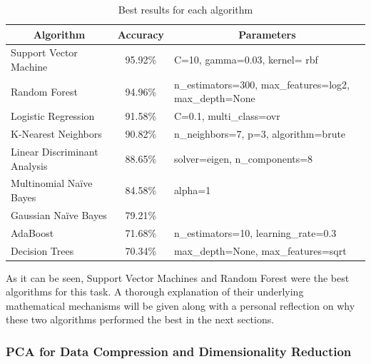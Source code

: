 \documentclass[letterpaper,10pt]{article}
\theoremstyle{mytheor}
\begin{document}
\begin{table}[H]
\centering
\begin{tabular}{|l|c|l|}
\hline
\multicolumn{1}{|c|}{\textbf{Algorithm}} & \textbf{Accuracy} & \multicolumn{1}{c|}{\textbf{Parameters}}          \\ \hline
Support Vector Machine                                      & 95.92\%           & C=10, gamma=0.03, kernel= rbf                     \\ \hline
Random Forest                             & 94.96\%           & n\_estimators=300, max\_features=log2, max\_depth=None \\ \hline
Logistic Regression                      & 91.58\%           & C=0.1, multi\_class=ovr                           \\ \hline
K-Nearest Neighbors                               & 90.82\%           & n\_neighbors=7, p=3, algorithm=brute                    \\ \hline
Linear Discriminant Analysis             & 88.65\%           & solver=eigen, n\_components=8                      \\ \hline
Multinomial Naïve Bayes                  & 84.58\%           & alpha=1                                           \\ \hline
Gaussian Naïve Bayes                     & 79.21\%           &                                                   \\ \hline
AdaBoost                                 & 71.68\%           & n\_estimators=10, learning\_rate=0.3                  \\ \hline
Decision Trees                           & 70.34\%           & max\_depth=None, max\_features=sqrt               \\ \hline
\end{tabular}
\caption{Best results for each algorithm}
\label{table:2}
\end{table}

As it can be seen, Support Vector Machines and Random Forest were the best algorithms for this task. A thorough explanation of their underlying mathematical mechanisms will be given along with a personal reflection on why these two algorithms performed the best in the next sections.

\subsubsection{PCA for Data Compression and Dimensionality Reduction}
\end{document}
